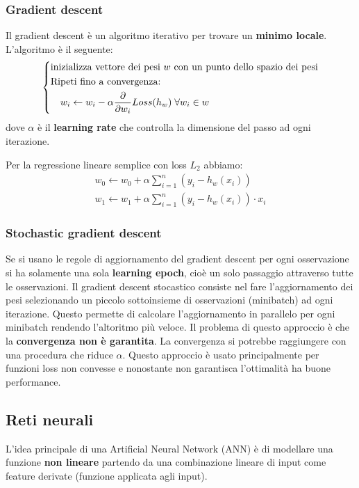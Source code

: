 \documentclass[a4paper]{article}
\begin{document}
\subsubsection{Gradient descent}
Il gradient descent è un algoritmo iterativo per trovare un \textbf{minimo locale}. L'algoritmo
è il seguente:
\[
  \left\{ \begin{aligned}
    &\text{inizializza vettore dei pesi \( w \) con un punto dello spazio dei pesi}\\
    &\text{Ripeti fino a convergenza:}\\
    &\quad w_i \leftarrow w_i - \alpha \frac{\partial}{\partial w_i} Loss(h_w) \;\forall w_i \in w\\
  \end{aligned} \right.
\] 
dove \( \alpha \) è il \textbf{learning rate} che controlla la dimensione del passo
ad ogni iterazione.
\begin{example}
  Per la regressione lineare semplice con loss \( L_2 \) abbiamo:
  \[
    \begin{aligned}
      w_0 \leftarrow w_0 + \alpha \sum_{i=1}^{n} (y_i - h_w(x_i))\\
      w_1 \leftarrow w_1 + \alpha \sum_{i=1}^{n} (y_i - h_w(x_i)) \cdot x_i
    \end{aligned}
  \]
\end{example}


\subsubsection{Stochastic gradient descent}
Se si usano le regole di aggiornamento del gradient descent per ogni osservazione
si ha solamente una sola \textbf{learning epoch}, cioè un solo passaggio attraverso
tutte le osservazioni. Il gradient descent stocastico consiste nel fare l'aggiornamento
dei pesi selezionando un piccolo sottoinsieme di osservazioni (minibatch) ad ogni
iterazione. Questo permette di calcolare l'aggiornamento in parallelo per ogni minibatch
rendendo l'altoritmo più veloce. Il problema di questo approccio è che la \textbf{convergenza
non è garantita}. La convergenza si potrebbe raggiungere con una procedura che riduce
\( \alpha \). Questo approccio è usato principalmente per funzioni loss non convesse e
nonostante non garantisca l'ottimalità ha buone performance.


\subsection{Reti neurali}
L'idea principale di una Artificial Neural Network (ANN) è di modellare una funzione
\textbf{non lineare} partendo da una combinazione lineare di input come feature derivate
(funzione applicata agli input).
\end{document}
